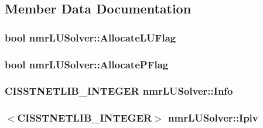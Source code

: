 \subsection{Member Data Documentation}
\hypertarget{classnmr_l_u_solver_a34bf65decc10c0ce0b20697404dcb328}{}
\subsubsection[{Allocate\+L\+U\+Flag}]{\setlength{\rightskip}{0pt plus 5cm}bool nmr\+L\+U\+Solver\+::\+Allocate\+L\+U\+Flag\hspace{0.3cm}{\ttfamily [protected]}}\label{classnmr_l_u_solver_a34bf65decc10c0ce0b20697404dcb328}
\hypertarget{classnmr_l_u_solver_aedb65694fb1672b67cf4b1e731e3438a}{}
\subsubsection[{Allocate\+P\+Flag}]{\setlength{\rightskip}{0pt plus 5cm}bool nmr\+L\+U\+Solver\+::\+Allocate\+P\+Flag\hspace{0.3cm}{\ttfamily [protected]}}\label{classnmr_l_u_solver_aedb65694fb1672b67cf4b1e731e3438a}
\hypertarget{classnmr_l_u_solver_a7a5bf0600413afceac134473b0651698}{}
\subsubsection[{Info}]{\setlength{\rightskip}{0pt plus 5cm}C\+I\+S\+S\+T\+N\+E\+T\+L\+I\+B\+\_\+\+I\+N\+T\+E\+G\+E\+R nmr\+L\+U\+Solver\+::\+Info\hspace{0.3cm}{\ttfamily [protected]}}\label{classnmr_l_u_solver_a7a5bf0600413afceac134473b0651698}
\hypertarget{classnmr_l_u_solver_ad1cd8e579ea67dbebc1586400a82ee58}{}
\subsubsection[{Ipiv}]{$<$C\+I\+S\+S\+T\+N\+E\+T\+L\+I\+B\+\_\+\+I\+N\+T\+E\+G\+E\+R$>$ nmr\+L\+U\+Solver\+::\+Ipiv\hspace{0.3cm}{\ttfamily [protected]}}\label{classnmr_l_u_solver_ad1cd8e579ea67dbebc1586400a82ee58}
\hypertarget{classnmr_l_u_solver_aaf0f1fb37af9ab5edff6fcb7f8244de4}{}
